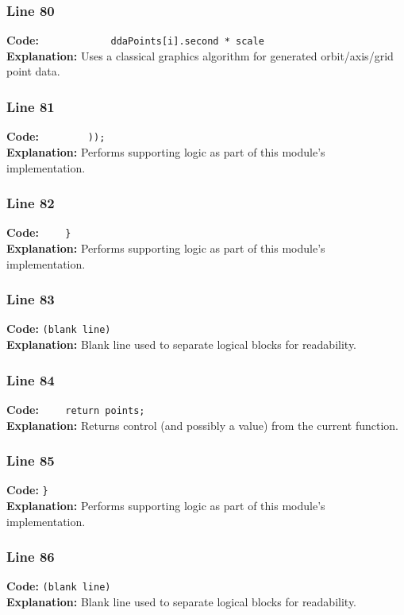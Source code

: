 \documentclass[11pt,a4paper]{article}
\begin{document}
\subsubsection*{Line 80}
\textbf{Code:} \verb|            ddaPoints[i].second * scale|\\
\textbf{Explanation:} Uses a classical graphics algorithm for generated orbit/axis/grid point data.

\subsubsection*{Line 81}
\textbf{Code:} \verb|        ));|\\
\textbf{Explanation:} Performs supporting logic as part of this module's implementation.

\subsubsection*{Line 82}
\textbf{Code:} \verb|    }|\\
\textbf{Explanation:} Performs supporting logic as part of this module's implementation.

\subsubsection*{Line 83}
\textbf{Code:} \texttt{(blank line)}\\
\textbf{Explanation:} Blank line used to separate logical blocks for readability.

\subsubsection*{Line 84}
\textbf{Code:} \verb|    return points;|\\
\textbf{Explanation:} Returns control (and possibly a value) from the current function.

\subsubsection*{Line 85}
\textbf{Code:} \verb|}|\\
\textbf{Explanation:} Performs supporting logic as part of this module's implementation.

\subsubsection*{Line 86}
\textbf{Code:} \texttt{(blank line)}\\
\textbf{Explanation:} Blank line used to separate logical blocks for readability.
\end{document}
